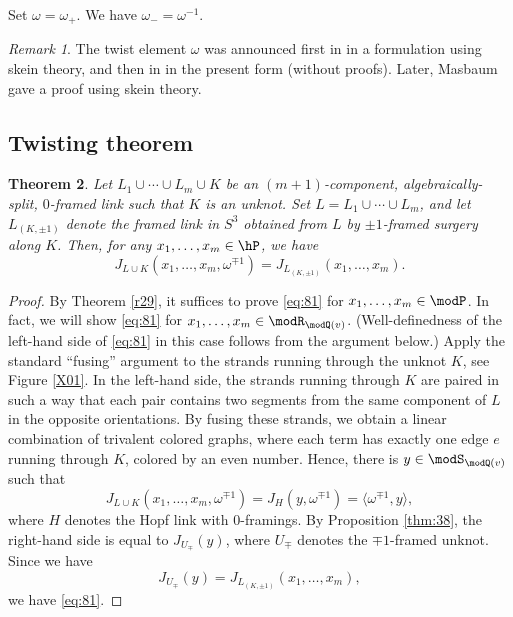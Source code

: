 \documentclass{amsart}
\numberwithin{equation}{section}
\numberwithin{figure}{section}
\theoremstyle{plain}
\newtheorem{theorem}{Theorem}[section]
\theoremstyle{definition}
\theoremstyle{remark}
\newtheorem{remark}[theorem]{Remark}
\begin{document}
Set $\omega =\omega _+$.  We have $\omega _-=\omega ^{-1}$.

\begin{remark}
  \label{r28}
  The twist element $\omega $ was announced first in \cite{H:iias2000} in a
  formulation using skein theory, and then in \cite{H:rims2001} in the
  present form (without proofs).  Later, Masbaum \cite{Masbaum} gave a
  proof using skein theory.
\end{remark}

\subsection{Twisting theorem}
\label{sec:twisting-theorems}

\begin{theorem}
  \label{thm:99}
  Let $L_1\cup \cdots\cup L_m\cup K$ be an $(m+1)$-component, algebraically-split,
  $0$-framed link such that $K$ is an unknot.  Set $L=L_1\cup \cdots\cup L_m$,
  and let $L_{(K,\pm 1)}$ denote the framed link in $S^3$ obtained from
  $L$ by $\pm 1$-framed surgery along $K$.  Then, for any
  $x_1,\ldots,x_m\in \hP$, we have
  \begin{equation}
    \label{eq:81}
    J_{L\cup K}(x_1,\ldots,x_m,\omega ^{\mp1})=J_{L_{(K,\pm 1)}}(x_1,\ldots,x_m).
  \end{equation}
\end{theorem}

\begin{proof}
  By Theorem \ref{r29}, it suffices to prove \eqref{eq:81} for
  $x_1,\ldots,x_m\in \modP $.  In fact, we will show \eqref{eq:81} for
  $x_1,\ldots,x_m\in \modR _{\modQ (v)}$.  (Well-definedness of the left-hand side
  of \eqref{eq:81} in this case follows from the argument below.)
  Apply the standard ``fusing'' argument to the strands running
  through the unknot $K$, see Figure
  \ref{X01}.{\def\tI{=\sum}}  In the
  left-hand side, the strands running through $K$ are paired in such a
  way that each pair contains two segments from the same component of
  $L$ in the opposite orientations.  By fusing these strands, we
  obtain a linear combination of trivalent colored graphs, where each
  term has exactly one edge $e$ running through $K$, colored by an
  even number.  Hence, there is $y\in \modS _{\modQ (v)}$ such that
  \begin{equation*}
    J_{L\cup K}(x_1,\ldots,x_m,\omega ^{\mp1}) =J_H(y,\omega ^{\mp1}) =\langle \omega ^{\mp1},y\rangle ,
  \end{equation*}
  where $H$ denotes the Hopf link with $0$-framings.  By Proposition
  \ref{thm:38}, the right-hand side is equal to $J_{U_\mp}(y)$, where
  $U_\mp$ denotes the $\mp1$-framed unknot.  Since we have
  \begin{equation*}
    J_{U_\mp}(y)=J_{L_{(K,\pm 1)}}(x_1,\ldots,x_m),
  \end{equation*}
  we have \eqref{eq:81}.
\end{proof}
\end{document}
